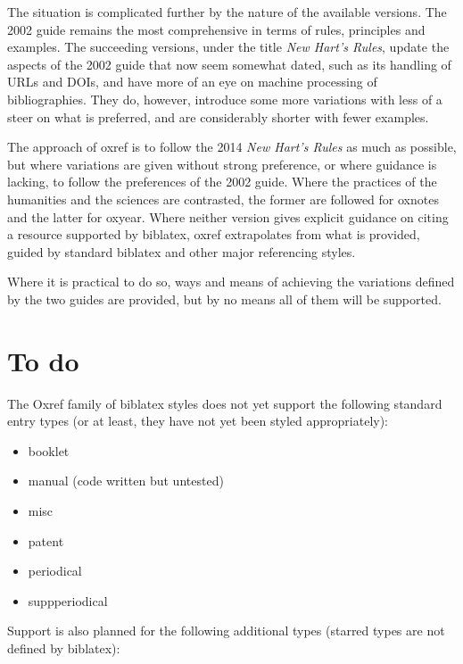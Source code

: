 \documentclass[extrafontsizes,11pt,a4paper,oneside]{memoir}
\begin{document}
The situation is complicated further by the nature of the available versions.
The 2002 guide remains the most comprehensive in terms of rules, principles and examples.
The succeeding versions, under the title \emph{New Hart's Rules},
update the aspects of the 2002 guide that now seem somewhat dated,
such as its handling of URLs and DOIs,
and have more of an eye on machine processing of bibliographies.
They do, however, introduce some more variations with less of a steer on what is preferred,
and are considerably shorter with fewer examples.

The approach of \textsf{oxref} is to follow the 2014 \emph{New Hart's Rules} as much as possible,
but where variations are given without strong preference, or where guidance is lacking,
to follow the preferences of the 2002 guide.
Where the practices of the humanities and the sciences are contrasted,
the former are followed for \textsf{oxnotes} and the latter for \textsf{oxyear}.
Where neither version gives explicit guidance on citing a resource supported by \textsf{biblatex},
\textsf{oxref} extrapolates from what is provided, guided by standard \textsf{biblatex}
and other major referencing styles.

Where it is practical to do so,
ways and means of achieving the variations defined by the two guides are provided,
but by no means all of them will be supported.

\section{To do}

The Oxref family of \textsf{biblatex} styles does not yet support the following standard entry types
(or at least, they have not yet been styled appropriately):

\begin{multicols}{2}
  \begin{itemize}\firmlist
    \item booklet
    \item manual (code written but untested)
    \item misc
    \item patent
    \item periodical
    \item suppperiodical
  \end{itemize}
\end{multicols}

Support is also planned for the following additional types (starred types are not defined by \textsf{biblatex}):
\end{document}
